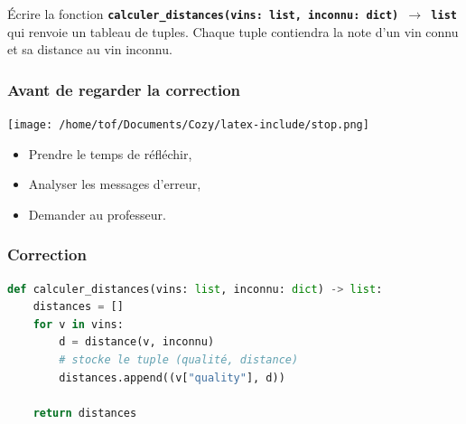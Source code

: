 \documentclass[svgnames,11pt]{beamer}
\begin{document}
\begin{frame}
    \frametitle{}

    \begin{activite}
    Écrire la fonction \textbf{\texttt{calculer\_distances(vins: list, inconnu: dict) $\rightarrow$ list}} qui renvoie un tableau de tuples. Chaque tuple contiendra la note d'un vin connu et sa distance au vin inconnu.
    \end{activite}

\end{frame}
\begin{frame}
    \frametitle{Avant de regarder la correction}
\begin{center}
    \centering
    \texttt{[image: /home/tof/Documents/Cozy/latex-include/stop.png]}
    \end{center}
{\Large
    \begin{itemize}
        \item Prendre le temps de réfléchir,
        \item Analyser les messages d'erreur,
        \item Demander au professeur.
    \end{itemize}
}
\end{frame}
\begin{frame}[fragile]
    \frametitle{Correction}

\begin{center}
\begin{lstlisting}[language=Python , basicstyle=\ttfamily\small, xleftmargin=0.2em, xrightmargin=-3em]
def calculer_distances(vins: list, inconnu: dict) -> list:
    distances = []
    for v in vins:
        d = distance(v, inconnu)
        # stocke le tuple (qualité, distance)
        distances.append((v["quality"], d))

    return distances
\end{lstlisting}
\end{center}

\end{frame}
\end{document}
